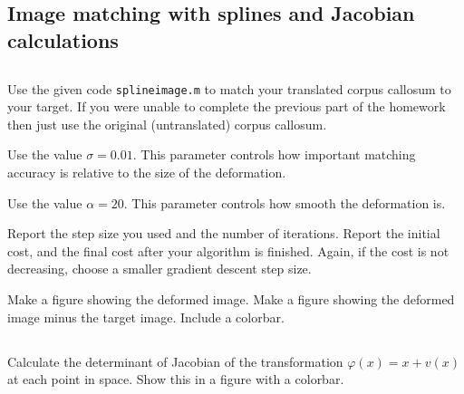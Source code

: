 \documentclass[17pt,landscape]{extarticle}
\begin{document}
\subsection{Image matching with splines and Jacobian calculations}

\subsection{}

Use the given code \verb$splineimage.m$ to match your translated corpus callosum to your target.  If you were unable to complete the previous part of the homework  then just use the original (untranslated) corpus callosum.

Use the value $\sigma = 0.01$.  This parameter controls how important matching accuracy is relative to the size of the deformation. 

Use the value $\alpha = 20$.  This parameter controls how smooth the deformation is.

Report the step size you used and the number of iterations.  Report the initial cost, and the final cost after your algorithm is finished.  Again, if the cost is not decreasing, choose a smaller gradient descent step size.

Make a figure showing the deformed image.  Make a figure showing the deformed image minus the target image. Include a colorbar.

\subsection{}
Calculate the determinant of Jacobian of the transformation $\varphi(x) = x + v(x)$ at each point in space.  Show this in a figure with a colorbar.
\end{document}
